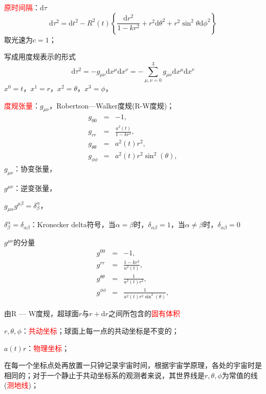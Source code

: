\documentclass[12pt,a4paper]{article}
\newcommand{\dif}{\mathrm{d}}
\begin{document}
\cite{2010宇宙大尺度结构的形成, 2012宇宙大尺度结构的形成} \textcolor{red}{原时间隔}：$\dif \tau$
\begin{equation}
\dif \tau^2 = \dif t^2 -R^2(t)\left\lbrace \frac{\dif r^2}{1-kr^2} +r^2 \dif \theta^2 +r^2 \sin^2 \theta \dif \phi^2 \right\rbrace
\end{equation}
取光速为$c = 1$；

写成用度规表示的形式
\begin{equation}
\dif \tau^2 = -g_{\mu \nu} \dif x^{\mu} \dif x^{\nu} = -\sum_{\mu, \nu = 0}^3 g_{\mu \nu} \dif x^{\mu} \dif x^{\nu}
\end{equation}
$x^0 = t$，$x^1 = r$，$x^2 = \theta$，$x^3 = \phi$，

\textcolor{red}{度规张量}：$g_{\mu \nu}$，Robertson—Walker度规(R-W度规)；
\begin{eqnarray}
\nonumber g_{00} &=& -1, \\
\nonumber g_{rr} &=& \frac{a^2(t)}{1-kr^2}, \\
\nonumber g_{\theta \theta} &=& a^2(t) r^2, \\
g_{\phi\phi} &=& a^2(t) r^2 \sin^2(\theta), 
\end{eqnarray}
$g_{\mu \nu}$：协变张量，

$g^{\mu \nu}$：逆变张量，

$g_{\mu \alpha} g^{\mu \beta} = \delta^{\alpha}_{\beta}$，

$\delta^{\alpha}_{\beta} = \delta_{\alpha\beta}$：Kronecker delta符号，当$\alpha = \beta$时，$\delta_{\alpha\beta} = 1$，当$\alpha \neq \beta$时，$\delta_{\alpha\beta} = 0$

$g^{\mu \nu}$的分量
\begin{eqnarray}
\nonumber g^{00} &=& -1, \\
\nonumber g^{rr} &=& \frac{1-kr^2}{a^2(t)}, \\
\nonumber g^{\theta \theta} &=& \frac{1}{a^2(t) r^2}, \\
g^{\phi\phi} &=& \frac{1}{a^2(t) r^2 \sin^2(\theta)}, 
\end{eqnarray}

由R --- W度规，超球面$r$与$r+\dif r$之间所包含的\textcolor{red}{固有体积}


$r, \theta, \phi$：\textcolor{red}{共动坐标}；球面上每一点的共动坐标是不变的；

$a(t) r$：\textcolor{red}{物理坐标}；

在每一个坐标点处再放置一只钟记录宇宙时间，根据宇宙学原理，各处的宇宙时是相同的；对于一个静止于共动坐标系的观测者来说，其世界线是$r, \theta, \phi$为常值的线(\textcolor{red}{测地线})；
\end{document}
